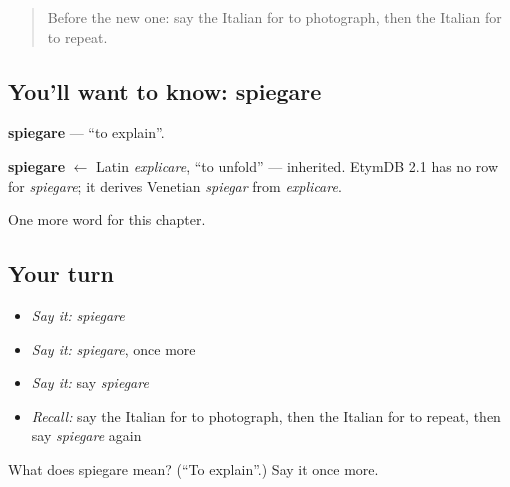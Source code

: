 \label{lesson:IT-C141-spiegare}



\begin{quote}
Before the new one: say the Italian for to photograph, then the Italian for to repeat.
\end{quote}

\subsection*{You'll want to know: spiegare}
\textbf{spiegare} — \textquotedblleft{}to explain\textquotedblright{}.

\begin{cousinweb}
\textbf{spiegare} $\leftarrow$ Latin \emph{explicare}, \textquotedblleft{}to unfold\textquotedblright{} — inherited. EtymDB 2.1 has no row for \emph{spiegare}; it derives Venetian \emph{spiegar} from \emph{explicare}.
\end{cousinweb}

\begin{grammarlens}[title={What you've built}]
One more word for this chapter.
\end{grammarlens}

\subsection*{Your turn}
\begin{itemize}
\raggedright
  \item \emph{Say it:} \emph{spiegare}
  \item \emph{Say it:} \emph{spiegare}, once more
  \item \emph{Say it:} say \emph{spiegare}
  \item \emph{Recall:} say the Italian for to photograph, then the Italian for to repeat, then say \emph{spiegare} again
\end{itemize}

\begin{tcolorbox}[breakable,colback=teal!4,colframe=teal!35!black,title={Before you move on}]
What does spiegare mean? (\textquotedblleft{}To explain\textquotedblright{}.) Say it once more.
\end{tcolorbox}
